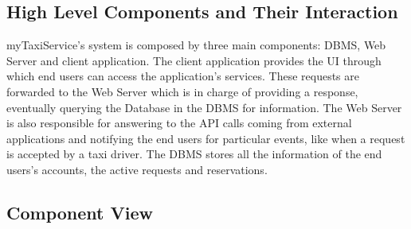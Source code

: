 \documentclass{article}
\begin{document}
\subsection{High Level Components and Their Interaction}
myTaxiService's system is composed by three main components: DBMS, Web Server and client application. The client application provides the UI through which end users can access the application's services. These requests are forwarded to the Web Server which is in charge of providing a response, eventually querying the Database in the DBMS for information. The Web Server is also responsible for answering to the API calls coming from external applications and notifying the end users for particular events, like when a request is accepted by a taxi driver. The DBMS stores all the information of the end users's accounts, the active requests and reservations. %

\subsection{Component View}
\begin{figure}[H]
\end{figure}
\end{document}
